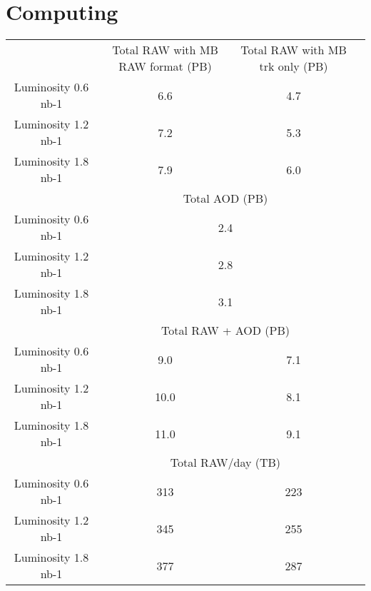 \section{Computing}
\label{sec:computing}

\begin{center}
\begin{tabular}{ |c|c|c|c|} 




\hline
&  Total RAW with MB RAW format (PB) &  Total RAW with MB trk only (PB)\\
Luminosity 0.6 nb-1 & 6.6 & 4.7 \\
Luminosity 1.2 nb-1 & 7.2 & 5.3 \\ 
Luminosity 1.8 nb-1 & 7.9 & 6.0 \\                 
\hline
& \multicolumn{2}{c|}{Total AOD (PB)}\\
Luminosity 0.6 nb-1 & \multicolumn{2}{c|}{2.4} \\
Luminosity 1.2 nb-1 & \multicolumn{2}{c|}{2.8} \\ 
Luminosity 1.8 nb-1 & \multicolumn{2}{c|}{3.1} \\
\hline
&  \multicolumn{2}{c|}{Total RAW + AOD (PB)}\\
Luminosity 0.6 nb-1 & 9.0 & 7.1 \\
Luminosity 1.2 nb-1 & 10.0 & 8.1 \\ 
Luminosity 1.8 nb-1 & 11.0 & 9.1 \\   
\hline 
&  \multicolumn{2}{c|}{Total RAW/day (TB)}\\
Luminosity 0.6 nb-1 & 313 & 223 \\
Luminosity 1.2 nb-1 & 345 & 255 \\ 
Luminosity 1.8 nb-1 & 377 & 287 \\   
\hline 
\end{tabular}
\end{center}